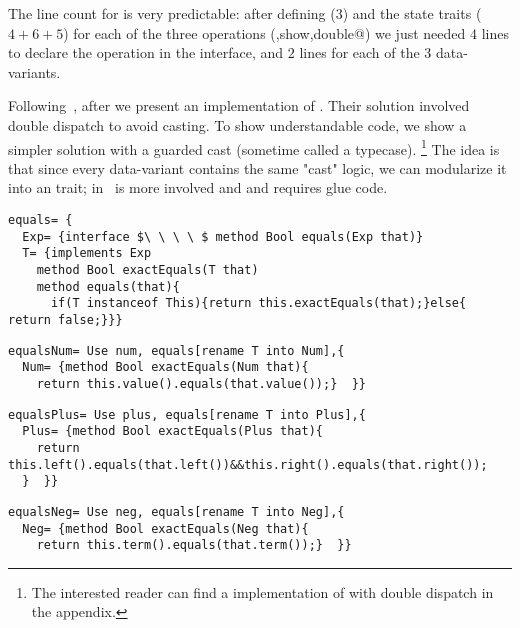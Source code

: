 The line count for \name is very predictable: after defining \Q@exp@ ($3$) and the state traits ($4+6+5$)
for each of the three operations (\Q@eval,show,double@) 
we just needed $4$ lines to declare the operation 
in the interface, and $2$ lines for each of the $3$ data-variants.

Following~\cite{Zenger-Odersky2005}, after \Q@double@ we present an implementation of \Q@equals@.
Their solution involved double dispatch to avoid casting.
To show understandable code, we show a simpler solution 
with a guarded cast (sometime called a typecase).%
\footnote{
The interested reader can find a \name implementation of \Q@equals@ with double dispatch
in the appendix.
}
The idea is that since every data-variant contains
 the same "cast" logic, 
 we can modularize it into an \Q@equals@ trait;
\Q@equals@ in~\cite{Zenger-Odersky2005} is more involved and
 and requires glue code.
\saveSpace\saveSpace
\begin{lstlisting}
equals= {
  Exp= {interface $\ \ \ \ $ method Bool equals(Exp that)}
  T= {implements Exp
    method Bool exactEquals(T that)
    method equals(that){
      if(T instanceof This){return this.exactEquals(that);}else{ return false;}}}
\end{lstlisting}
\multiCode
\begin{lstlisting}
equalsNum= Use num, equals[rename T into Num],{
  Num= {method Bool exactEquals(Num that){
    return this.value().equals(that.value());}  }}
\end{lstlisting}
\multiCode
\begin{lstlisting}
equalsPlus= Use plus, equals[rename T into Plus],{
  Plus= {method Bool exactEquals(Plus that){
    return this.left().equals(that.left())&&this.right().equals(that.right());
  }  }}
\end{lstlisting}
\multiCode
\begin{lstlisting}
equalsNeg= Use neg, equals[rename T into Neg],{
  Neg= {method Bool exactEquals(Neg that){
    return this.term().equals(that.term());}  }}
\end{lstlisting}
\saveSpace\saveSpace


